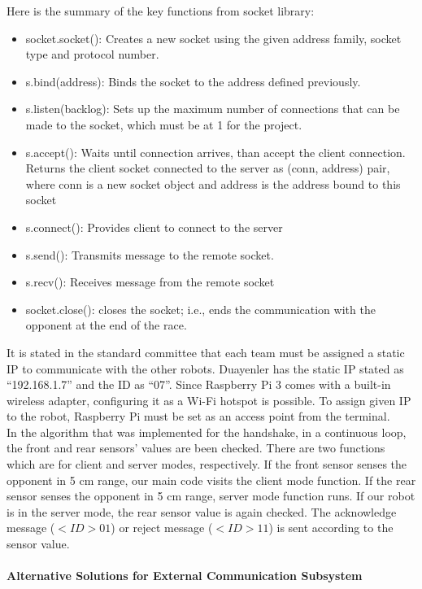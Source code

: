 \documentclass[a4paper,12pt]{article}
\begin{document}
	Here is the summary of the key functions from socket library:
	
	\begin{itemize}
		\item socket.socket(): Creates a new socket using the given address family, socket type and protocol number.
		\item s.bind(address): Binds the socket to the address defined previously.
		\item s.listen(backlog): Sets up the maximum number of connections that can be made to the socket, which must be at 1 for the project.
		\item	s.accept(): Waits until connection arrives, than accept the client connection. Returns the client socket connected to the server as (conn, address) pair, where conn is a new socket object and address is the address bound to this socket
		\item	s.connect(): Provides client to connect to the server
		\item	s.send(): Transmits message to the remote socket.
		\item	s.recv(): Receives message from the remote socket
		\item	socket.close(): closes the socket; i.e., ends the communication with the opponent at the end of the race.
	\end{itemize}
	
	It is stated in the standard committee that each team must be assigned a static IP to communicate with the other robots. Duayenler has the static IP stated as “192.168.1.7” and the ID as “07”. Since Raspberry Pi 3 comes with a built-in wireless adapter, configuring it as a Wi-Fi hotspot is possible. To assign given IP to the robot, Raspberry Pi must be set as an access point from the terminal.\\
	
	In the algorithm that was implemented for the handshake, in a continuous loop, the front and rear sensors' values are been checked. There are two functions which are for client and server modes, respectively. If the front sensor senses the opponent in 5 cm range, our main code visits the client mode function. If the rear sensor senses the opponent in 5 cm range, server mode function runs. If our robot is in the server mode, the rear sensor value is again checked. The acknowledge message ($< ID> 01$) or reject message ($< ID> 11$) is sent according to the sensor value.
	
	\paragraph{Alternative Solutions for External Communication Subsystem}
	
\end{document}

